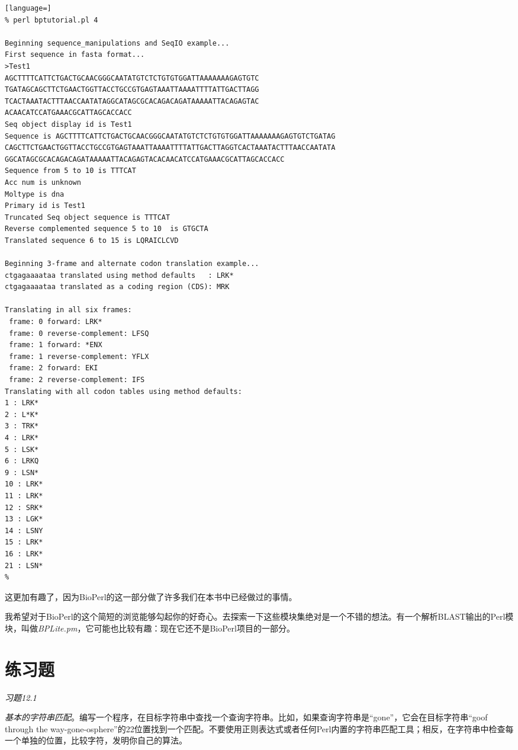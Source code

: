 \begin{lstlisting}[language=]
% perl bptutorial.pl 4

Beginning sequence_manipulations and SeqIO example... 
First sequence in fasta format... 
>Test1
AGCTTTTCATTCTGACTGCAACGGGCAATATGTCTCTGTGTGGATTAAAAAAAGAGTGTC
TGATAGCAGCTTCTGAACTGGTTACCTGCCGTGAGTAAATTAAAATTTTATTGACTTAGG
TCACTAAATACTTTAACCAATATAGGCATAGCGCACAGACAGATAAAAATTACAGAGTAC
ACAACATCCATGAAACGCATTAGCACCACC
Seq object display id is Test1
Sequence is AGCTTTTCATTCTGACTGCAACGGGCAATATGTCTCTGTGTGGATTAAAAAAAGAGTGTCTGATAG
CAGCTTCTGAACTGGTTACCTGCCGTGAGTAAATTAAAATTTTATTGACTTAGGTCACTAAATACTTTAACCAATATA
GGCATAGCGCACAGACAGATAAAAATTACAGAGTACACAACATCCATGAAACGCATTAGCACCACC 
Sequence from 5 to 10 is TTTCAT 
Acc num is unknown 
Moltype is dna 
Primary id is Test1 
Truncated Seq object sequence is TTTCAT 
Reverse complemented sequence 5 to 10  is GTGCTA  
Translated sequence 6 to 15 is LQRAICLCVD 

Beginning 3-frame and alternate codon translation example... 
ctgagaaaataa translated using method defaults   : LRK*
ctgagaaaataa translated as a coding region (CDS): MRK

Translating in all six frames:
 frame: 0 forward: LRK*
 frame: 0 reverse-complement: LFSQ
 frame: 1 forward: *ENX
 frame: 1 reverse-complement: YFLX
 frame: 2 forward: EKI
 frame: 2 reverse-complement: IFS
Translating with all codon tables using method defaults:
1 : LRK*
2 : L*K*
3 : TRK*
4 : LRK*
5 : LSK*
6 : LRKQ
9 : LSN*
10 : LRK*
11 : LRK*
12 : SRK*
13 : LGK*
14 : LSNY
15 : LRK*
16 : LRK*
21 : LSN*
% 
\end{lstlisting}

这更加有趣了，因为BioPerl的这一部分做了许多我们在本书中已经做过的事情。

我希望对于BioPerl的这个简短的浏览能够勾起你的好奇心。去探索一下这些模块集绝对是一个不错的想法。有一个解析BLAST输出的Perl模块，叫做\textit{BPLite.pm}，它可能也比较有趣：现在它还不是BioPerl项目的一部分。

\section{练习题}
\textcolor{black}{\textit{习题12.1}}
\begin{adjustwidth}{4em}{}
\textit{基本的字符串匹配}。编写一个程序，在目标字符串中查找一个查询字符串。比如，如果查询字符串是“gone”，它会在目标字符串“goof through the way-gone-osphere”的22位置找到一个匹配。不要使用正则表达式或者任何Perl内置的字符串匹配工具；相反，在字符串中检查每一个单独的位置，比较字符，发明你自己的算法。
\end{adjustwidth}

